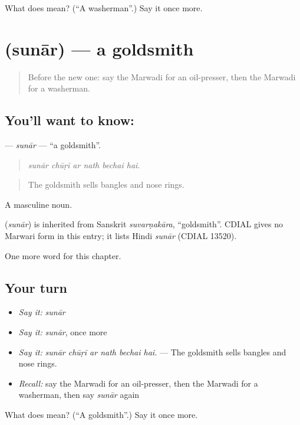 \begin{tcolorbox}[breakable,colback=teal!4,colframe=teal!35!black,title={Before you move on}]
What does  mean? (\textquotedblleft{}A washerman\textquotedblright{}.) Say it once more.
\end{tcolorbox}
\section[\texorpdfstring{\mw{सुनार} (sunār)}{सुनार (sunār)}]{ (sunār) — a goldsmith}

\label{lesson:MW-C263-sunar}



\begin{quote}
Before the new one: say the Marwadi for an oil-presser, then the Marwadi for a washerman.
\end{quote}

\subsection*{You'll want to know: }
\textbf{} — \emph{sunār} — \textquotedblleft{}a goldsmith\textquotedblright{}.

\begin{quote}
     
\end{quote}

\begin{quote}
\emph{sunār chūṛī ar nath bechai hai.}
\end{quote}

\begin{quote}
The goldsmith sells bangles and nose rings.
\end{quote}

A masculine noun.

\begin{cousinweb}
\textbf{} (\emph{sunār}) is inherited from Sanskrit \emph{suvarṇakāra}, \textquotedblleft{}goldsmith\textquotedblright{}. CDIAL gives no Marwari form in this entry; it lists Hindi \emph{sunār} (CDIAL 13520).
\end{cousinweb}

\begin{grammarlens}[title={What you've built}]
One more word for this chapter.
\end{grammarlens}

\subsection*{Your turn}
\begin{itemize}
\raggedright
  \item \emph{Say it:} \emph{sunār}
  \item \emph{Say it:} \emph{sunār}, once more
  \item \emph{Say it:} \emph{sunār chūṛī ar nath bechai hai.} — The goldsmith sells bangles and nose rings.
  \item \emph{Recall:} say the Marwadi for an oil-presser, then the Marwadi for a washerman, then say \emph{sunār} again
\end{itemize}

\begin{tcolorbox}[breakable,colback=teal!4,colframe=teal!35!black,title={Before you move on}]
What does  mean? (\textquotedblleft{}A goldsmith\textquotedblright{}.) Say it once more.
\end{tcolorbox}
